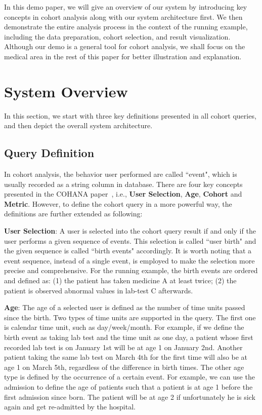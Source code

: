 In this demo paper, we will give an overview of our system by introducing key concepts in cohort analysis along with our system architecture first. We then demonstrate the entire analysis process in the context of the running example, including the data preparation, cohort selection, and result visualization.
Although our demo is a general tool for cohort analysis, we shall focus on the medical area in the rest of this paper for better illustration and explanation.

\section{System Overview}
In this section, we start with three key definitions presented in all cohort queries, and then depict the overall system architecture.  

\subsection{Query Definition}
In cohort analysis, the behavior user performed are called ``event", which is usually recorded as a string column in database. 
There are four key concepts presented in the COHANA paper~\cite{jiang2016cohort}, i.e., \textbf{User Selection}, \textbf{Age}, \textbf{Cohort} and \textbf{Metric}.
However, to define the cohort query in a more powerful way, the definitions are further extended as following:

\textbf{User Selection}: A user is selected into the cohort query result if and only if the user performs a given sequence of events. This selection is called ``user birth" and the given sequence is called ``birth events" accordingly. It is worth noting that a event sequence, instead of a single event, is employed to make the selection more precise and comprehensive.
For the running example, the birth events are ordered and defined as: (1) the patient has taken medicine A at least twice; (2) the patient is observed abnormal values in lab-test C afterwards.

\textbf{Age}: The age of a selected user is defined as the number of time units passed since the birth. Two types of time units are supported in the query. The first one is calendar time unit, such as day/week/month. For example, if we define the birth event as taking lab test and the time unit as one day, a patient whose first recorded lab test is on January 1st will be at age 1 on January 2nd. 
Another patient taking the same lab test on March 4th for the first time will also be at age 1 on March 5th, regardless of the difference in birth times. The other age type is defined by the occurrence of a certain event. For example, we can use the admission to define the age of patients such that a patient is at age 1 before the first admission since born.
The patient will be at age 2 if unfortunately he is sick again and get re-admitted by the hospital.

